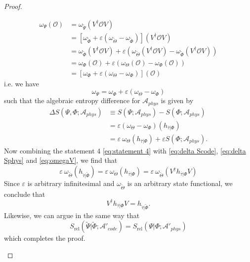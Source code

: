 \documentclass[a4paper,11pt]{article}
\renewcommand{\=}[1]{\stackrel{#1}{=}} %
\def\A{\mathcal{A}}
\def\O{\mathcal{O}}
\def\Srel{S_{\text{rel}}}
\begin{document}
\begin{proof}
\begin{itemize}
		\begin{equation}
			\begin{aligned}
				\omega_{\Psi}(\O)&=\omega_{\widetilde{\Psi}}(V^\dagger\O V)\\
				&=\left[\omega_{\widetilde{\Phi}}+\varepsilon(\omega_{\widetilde{\Theta}}-\omega_{\widetilde{\Phi}})\right](V^\dagger\O V)\\
				&=\omega_{\widetilde{\Phi}}(V^\dagger\O V)+\varepsilon(\omega_{\widetilde{\Theta}}(V^\dagger\O V)-\omega_{\widetilde{\Phi}}(V^\dagger\O V))\\
				&=\omega_{\Phi}(\O )+\varepsilon(\omega_{\Theta}(\O )-\omega_{\Phi}(\O ))\\
				&=\left[\omega_{\Phi}+\varepsilon(\omega_{\Theta}-\omega_{\Phi})\right](\O )
			\end{aligned}
		\end{equation}
		i.e. we have
		\begin{equation}
			\omega_{\Psi}=\omega_{\Phi}+\varepsilon(\omega_{\Theta}-\omega_{\Phi})
		\end{equation}
		such that
		the algebraic entropy difference for $\A_{phys}$ is given by
		\begin{equation}\label{eq:delta Sphys}
			\begin{aligned}
				\Delta S(\Psi,\Phi;\A_{phys})&\equiv S(\Psi;\A_{phys})-S(\Phi;\A_{phys})\\
				&=\varepsilon(\omega_{\Theta}-\omega_{\Phi})(h_{\bar{\tau}|\Phi})\\
				&=\varepsilon~\omega_{\Theta}(h_{\bar{\tau}|\Phi})+\varepsilon S(\Phi;\A_{phys}).
			\end{aligned}
		\end{equation}
		Now combining the statement 4 \eqref{eq:statement 4} with \eqref{eq:delta Scode}, \eqref{eq:delta Sphys} and \eqref{eq:omegaV}, we find that
		\begin{equation}
			\varepsilon~\omega_{\widetilde{\Theta}}(h_{\widetilde{\tau}|\widetilde{\Phi}})=\varepsilon~\omega_{\Theta}(h_{\bar{\tau}|\Phi})=\varepsilon~\omega_{\widetilde{\Theta}}(V^\dagger h_{\bar{\tau}|\Phi}V)
		\end{equation}
		Since $\varepsilon$ is arbitrary infinitesimal and $\omega_{\widetilde{\Theta}}$ is an arbitrary state functional, we conclude that
		\begin{equation}
			V^\dagger h_{\bar{\tau }|\Phi}V=h_{\widetilde{\tau}|\widetilde{\Phi}}.
		\end{equation}
		Likewise, we can argue in the same way that
		\begin{equation}
			\Srel(\widetilde{\Psi}|\widetilde{\Phi};\A'_{code})=\Srel(\Psi|\Phi;\A'_{phys})
		\end{equation}
		which completes the proof.
		

\end{itemize}
\end{proof}
\end{document}
